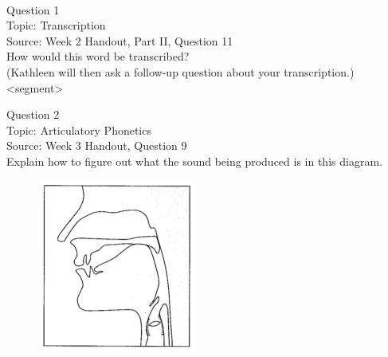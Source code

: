 \documentclass[12pt]{article}
\begin{document}
\newpage

\begin{center}
\textbf{{\color{red}{\HUGE END OF EXAM}}}\\

\end{center}
\newpage

\begin{center}
\textbf{{\color{blue}{\HUGE START OF EXAM\\}}}

\textbf{{\color{blue}{\HUGE Student ID: 98910\\}}}

\textbf{{\color{blue}{\HUGE \\}}}

\end{center}
\newpage

{\large Question 1}\\

Topic: Transcription\\
Source: Week 2 Handout, Part II, Question 11\\

How would this word be transcribed?\\ (Kathleen will then ask a follow-up question about your transcription.)\\

<segment>


\newpage

{\large Question 2}\\

Topic: Articulatory Phonetics\\
Source: Week 3 Handout, Question 9\\

Explain how to figure out what the sound being produced is in this diagram.\\

\begin{figure}[H]
\includegraphics{../images/sagittal_k.png}
\end{figure}
\end{document}
